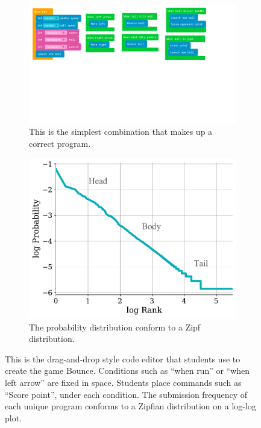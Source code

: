 \documentclass{article}
\begin{document}
\begin{figure}[ht]
     \centering
     \begin{subfigure}[b]{0.65\textwidth}
         \centering
         \includegraphics[width=\textwidth]{images/Code_org_snippets.pdf}
         \caption{This is the simplest combination that makes up a correct program.}
         \label{fig:code-area}
     \end{subfigure}
     \quad
     \begin{subfigure}[b]{0.3\textwidth}
         \centering
         \includegraphics[width=\textwidth]{images/log_log_plot.pdf}
         \caption{The probability distribution conform  to a Zipf distribution.}
        \label{fig:log-log-plot}
     \end{subfigure}
    \caption{This is the drag-and-drop style code editor that students use to create the game Bounce. Conditions such as ``when run'' or ``when left arrow'' are fixed in space. Students place commands such as ``Score point'', under each condition. The submission frequency of each unique program conforms to a Zipfian distribution on a log-log plot.}
    \label{fig:three graphs}
\end{figure}
\end{document}
